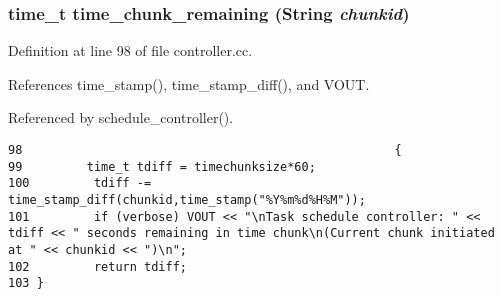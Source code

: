 \subsubsection{\setlength{\rightskip}{0pt plus 5cm}time\_\-t time\_\-chunk\_\-remaining ({\bf String} {\em chunkid})\hspace{0.3cm}{\tt  [inline]}}\label{controller_8cc_a1}




Definition at line 98 of file controller.cc.

References time\_\-stamp(), time\_\-stamp\_\-diff(), and VOUT.

Referenced by schedule\_\-controller().



\footnotesize\begin{verbatim}98                                                    {
99         time_t tdiff = timechunksize*60;
100         tdiff -= time_stamp_diff(chunkid,time_stamp("%Y%m%d%H%M"));
101         if (verbose) VOUT << "\nTask schedule controller: " << tdiff << " seconds remaining in time chunk\n(Current chunk initiated at " << chunkid << ")\n";
102         return tdiff;
103 }
\end{verbatim}\normalsize 
